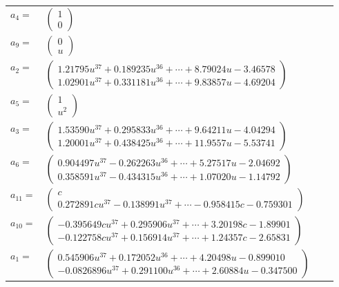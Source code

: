 \documentclass[1p]{elsarticle_modified}
\theoremstyle{definition}
\begin{document}
\begin{tabular}{m{7pt} m{180pt} m{7pt} m{180pt} }
\flushright $a_{4}=$&$\begin{pmatrix}1\\0\end{pmatrix}$ \\
\flushright $a_{9}=$&$\begin{pmatrix}0\\u\end{pmatrix}$ \\
\flushright $a_{2}=$&$\begin{pmatrix}1.21795 u^{37}+0.189235 u^{36}+\cdots+8.79024 u-3.46578\\1.02901 u^{37}+0.331181 u^{36}+\cdots+9.83857 u-4.69204\end{pmatrix}$ \\
\flushright $a_{5}=$&$\begin{pmatrix}1\\u^2\end{pmatrix}$ \\
\flushright $a_{3}=$&$\begin{pmatrix}1.53590 u^{37}+0.295833 u^{36}+\cdots+9.64211 u-4.04294\\1.20001 u^{37}+0.438425 u^{36}+\cdots+11.9557 u-5.53741\end{pmatrix}$ \\
\flushright $a_{6}=$&$\begin{pmatrix}0.904497 u^{37}-0.262263 u^{36}+\cdots+5.27517 u-2.04692\\0.358591 u^{37}-0.434315 u^{36}+\cdots+1.07020 u-1.14792\end{pmatrix}$ \\
\flushright $a_{11}=$&$\begin{pmatrix}c\\0.272891 c u^{37}-0.138991 u^{37}+\cdots-0.958415 c-0.759301\end{pmatrix}$ \\
\flushright $a_{10}=$&$\begin{pmatrix}-0.395649 c u^{37}+0.295906 u^{37}+\cdots+3.20198 c-1.89901\\-0.122758 c u^{37}+0.156914 u^{37}+\cdots+1.24357 c-2.65831\end{pmatrix}$ \\
\flushright $a_{1}=$&$\begin{pmatrix}0.545906 u^{37}+0.172052 u^{36}+\cdots+4.20498 u-0.899010\\-0.0826896 u^{37}+0.291100 u^{36}+\cdots+2.60884 u-0.347500\end{pmatrix}$ \\

\end{tabular}
\end{document}
